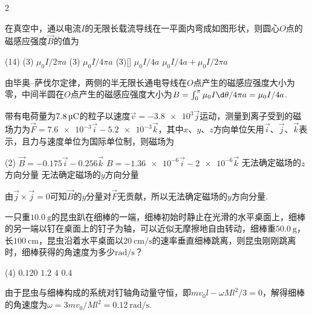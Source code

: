 \documentclass[quiet, fontset = fandol, AutoFakeSlant, 10pt]{ctexart}
\begin{document}
\begin{paracol}{2}
\begin{problem}
    在真空中，通以电流$I$的无限长载流导线在一平面内弯成如图形状，则圆心$O$点的磁感应强度$\vec B$的值为
    \begin{tasks}(14)
        \task*(3) $\mu_0I/2\pi a$
        \task*(3) $\mu_0I/4\pi a$
        \task*(3)[\true] $\mu_0I/4a$
        \task* $\mu_0I/4a+\mu_0I/2\pi a$
    \end{tasks}
    \switchcolumn\vspace*{\fill}
    \centering
    \vspace*{\fill}
\end{problem}
\end{paracol}
\begin{solution}
    由毕奥--萨伐尔定律，两侧的半无限长通电导线在$O$点产生的磁感应强度大小为零，中间半圆在$O$点产生的磁感应强度大小为$B=\int_0^\pi\mu_0I\d\theta/4\pi a=\mu_0I/4 a$.
\end{solution}

\begin{problem}
    带有电荷量为$\qty{7.8}\uC$的粒子以速度$\vec v=\num{-3.8e3}\vec j$运动，测量到离子受到的磁场力为$\vec F=\num{7.6e-3}\vec i-\num{5.2e-3}\vec k$，其中$x$、$y$、$z$方向单位矢用$\vec i$、$\vec j$、$\vec k$表示，且力与速度单位为国际单位制，则磁场为
    \begin{tasks}(2)
        \task $\vec B=-0.175\vec i-0.256\vec k$
        \task $B=\num{-1.36e-6}\vec i-\num{2e-6}\vec k$
        \task 无法确定磁场的$z$方向分量
        \task[\true] 无法确定磁场的$y$方向分量
    \end{tasks}
\end{problem}
\begin{solution}
    由$\vec j\times\vec j=0$可知$\vec B$的$y$分量对$\vec F$无贡献，所以无法确定磁场的$y$方向分量.
\end{solution}

\begin{problem}
    一只重$\qty{10.0}\g$的昆虫趴在细棒的一端，细棒初始时静止在光滑的水平桌面上，细棒的另一端以钉在桌面上的钉子为轴，可以近似无摩擦地自由转动，细棒重$\qty{50.0}\g$，长$\qty{100}\cm$，昆虫沿着水平桌面以$\qty{20}{\cm/\s}$的速率垂直细棒跳离，则昆虫刚刚跳离时，细棒获得的角速度为多少$\unit{\radian/\s}$？
    \begin{tasks}(4)
        \task[\true] $0.120$
        \task $1.2$
        \task $4$
        \task $0.4$
    \end{tasks}
\end{problem}
\begin{solution}
    由于昆虫与细棒构成的系统对钉轴角动量守恒，即$mv_0l-\omega Ml^2/3=0$，解得细棒的角速度为$\omega=3mv_0/Ml^2=\qty{0.12}{\radian/\s}$.
\end{solution}
\end{document}
